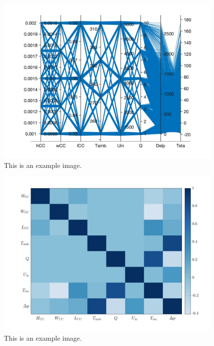         \begin{figure}[H]
            \centering
            \includegraphics[width=1\textwidth]{00_Images/00_Small_Stack_Images/00_Parallel_Coordinate_Plot_July_10_2024_v1.jpg}  %
            \caption{This is an example image.}
            \label{fig:example1}
        \end{figure}

        \begin{figure}[H]
            \centering
            \includegraphics[width=1\textwidth]{00_Images/00_Small_Stack_Images/00_Spearman_Correlation_Matrix_Heatmap_July_10_2024_v1.jpg}  %
            \caption{This is an example image.}
            \label{fig:example1}
        \end{figure}

